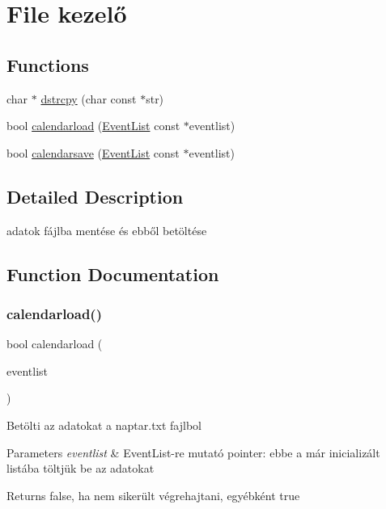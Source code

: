 \hypertarget{group__file}{}\section{File kezelő}
\label{group__file}
\subsection*{Functions}
\begin{DoxyCompactItemize}
\item 
char $\ast$ \hyperlink{group__file_ga91b52505951ff88321e947b6e1c4b779}{dstrcpy} (char const $\ast$str)
\item 
bool \hyperlink{group__file_gaf4efa1e078c7552b2f70daf3a40039c7}{calendarload} (\hyperlink{struct_event_list}{Event\+List} const $\ast$eventlist)
\item 
bool \hyperlink{group__file_ga7f69872489b7c1c4bcdd125319a87b2e}{calendarsave} (\hyperlink{struct_event_list}{Event\+List} const $\ast$eventlist)
\end{DoxyCompactItemize}


\subsection{Detailed Description}
adatok fájlba mentése és ebből betöltése 

\subsection{Function Documentation}
\mbox{\label{group__file_gaf4efa1e078c7552b2f70daf3a40039c7}} 
\subsubsection{\texorpdfstring{calendarload()}{calendarload()}}
{\footnotesize\ttfamily bool calendarload (\begin{DoxyParamCaption}\item[{\hyperlink{struct_event_list}{Event\+List} const $\ast$}]{eventlist }\end{DoxyParamCaption})}

Betölti az adatokat a naptar.\+txt fajlbol 
\begin{DoxyParams}{Parameters}
{\em eventlist} & Event\+List-\/re mutató pointer\+: ebbe a már inicializált listába töltjük be az adatokat \\
\hline
\end{DoxyParams}
\begin{DoxyReturn}{Returns}
false, ha nem sikerült végrehajtani, egyébként true 
\end{DoxyReturn}
\mbox{\label{group__file_ga7f69872489b7c1c4bcdd125319a87b2e}} 
